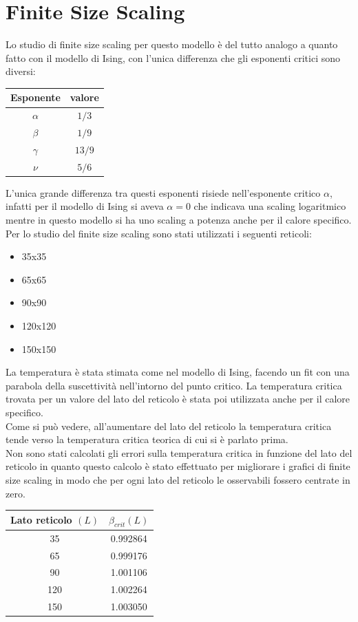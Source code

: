 \newpage
\section{Finite Size Scaling}
Lo studio di finite size scaling per questo modello è del tutto analogo a quanto fatto con il modello di Ising, con l'unica differenza che gli esponenti critici sono diversi:
\begin{center}
	\begin{tabular}{c c}
	\toprule
	Esponente & valore \\
	\midrule
	$\alpha$ &  $1/3$ \\
	$\beta $ & $1/9$\\
	$\gamma$ & $13/9$ \\
	$\nu$ & $5/6$ \\
	\bottomrule
	\end{tabular}
\end{center}
L'unica grande differenza tra questi esponenti risiede nell'esponente critico $\alpha$, infatti per il modello di Ising si aveva $\alpha=0$ che indicava una scaling logaritmico mentre in questo modello si ha uno scaling a potenza anche per il calore specifico.
Per lo studio del finite size scaling sono stati utilizzati i seguenti reticoli:
\begin{itemize}
\item 35x35
\item 65x65
\item 90x90
\item 120x120
\item 150x150
\end{itemize}
La temperatura è stata stimata come nel modello di Ising, facendo un fit con una parabola della suscettività nell'intorno del punto critico. La temperatura critica trovata per un valore del lato del reticolo è stata poi utilizzata anche per il calore specifico. \\
Come si può vedere, all'aumentare del lato del reticolo la temperatura critica tende verso la temperatura critica teorica di cui si è parlato prima. \\
Non sono stati calcolati gli errori sulla temperatura critica in funzione del lato del reticolo in quanto questo calcolo è stato effettuato per migliorare i grafici di finite size scaling in modo che per ogni lato del reticolo le osservabili fossero centrate in zero.

\begin{center}
	\begin{tabular}{c c}
	\toprule
	Lato reticolo $(L)$ & $\beta_{crit}(L)$ \\
	\midrule
	35 & 0.992864 \\
	65 & 0.999176 \\
	90 &  1.001106 \\
	120 &  1.002264 \\
	150 & 1.003050\\
	\bottomrule
	\end{tabular}
\end{center}

